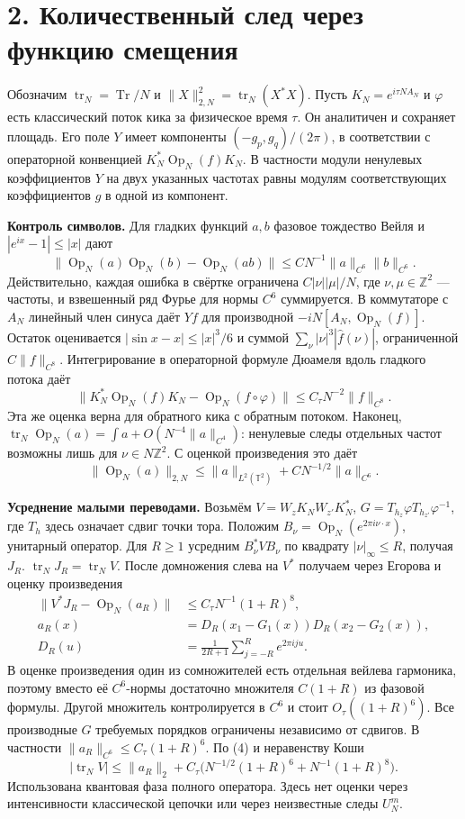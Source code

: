 \documentclass[11pt,a4paper]{article}
\newcommand{\Tr}{\operatorname{Tr}}
\newcommand{\Op}{\operatorname{Op}}
\newcommand{\T}{\mathbb{T}}
\newcommand{\Z}{\mathbb Z}
\newcommand{\sect}[1]{\section*{\sffamily\color{ink}#1}}
\newcommand{\subt}[1]{\par\medskip\noindent\textbf{#1.}\quad}
\begin{document}
\newpage
\sect{2. Количественный след через функцию смещения}
Обозначим \(\operatorname{tr}_N=\Tr/N\) и \(\|X\|_{2,N}^2=\operatorname{tr}_N(X^*X)\). Пусть \(K_N=e^{i\tau N A_N}\) и \(\varphi\) есть классический поток кика за физическое время \(\tau\). Он аналитичен и сохраняет площадь. Его поле \(Y\) имеет компоненты \((-g_p,g_q)/(2\pi)\), в соответствии с операторной конвенцией \(K_N^*\Op_N(f)K_N\). В частности модули ненулевых коэффициентов \(Y\) на двух указанных частотах равны модулям соответствующих коэффициентов \(g\) в одной из компонент.

\subt{Контроль символов}
Для гладких функций \(a,b\) фазовое тождество Вейля и \(|e^{ix}-1|\le |x|\) дают
\[
 \|\Op_N(a)\Op_N(b)-\Op_N(ab)\|
       \le C N^{-1}\|a\|_{C^6}\|b\|_{C^6}.
\]
Действительно, каждая ошибка в свёртке ограничена
\(C|\nu||\mu|/N\), где \(\nu,\mu\in\Z^2\) — частоты, и взвешенный ряд Фурье для нормы \(C^6\) суммируется. В коммутаторе с \(A_N\) линейный член синуса даёт \(Yf\) для производной \(-iN[A_N,\Op_N(f)]\). Остаток оценивается \(|\sin x-x|\le |x|^3/6\) и суммой \(\sum_\nu |\nu|^3|\widehat f(\nu)|\), ограниченной \(C\|f\|_{C^8}\). Интегрирование в операторной формуле Дюамеля вдоль гладкого потока даёт
\[
 \|K_N^*\Op_N(f)K_N-\Op_N(f\circ\varphi)\|
     \le C_\tau N^{-2}\|f\|_{C^8}.
\]
Эта же оценка верна для обратного кика с обратным потоком. Наконец, \(\operatorname{tr}_N\Op_N(a)=\int a+O(N^{-4}\|a\|_{C^4})\): ненулевые следы отдельных частот возможны лишь для \(\nu\in N\Z^2\). С оценкой произведения это даёт
\[
  \|\Op_N(a)\|_{2,N}\le\|a\|_{L^2(\T^2)}
                              +C N^{-1/2}\|a\|_{C^6}.             \tag{4}
\]

\subt{Усреднение малыми переводами}
Возьмём \(V=W_z K_N W_{z'}K_N^*\), \(G=T_{h_z}\varphi T_{h_{z'}}\varphi^{-1}\), где \(T_h\) здесь означает сдвиг точки тора. Положим \(B_\nu=\Op_N(e^{2\pi i\nu\cdot x})\), унитарный оператор. Для \(R\ge1\) усредним \(B_\nu^* V B_\nu\) по квадрату \(|\nu|_\infty\le R\), получая \(J_R\). \(\operatorname{tr}_N J_R=\operatorname{tr}_N V\). После домножения слева на \(V^*\) получаем через Егорова и оценку произведения
\begin{align*}
 \|V^*J_R-\Op_N(a_R)\|&\le C_\tau N^{-1}(1+R)^8,\\
 a_R(x)&=D_R(x_1-G_1(x))D_R(x_2-G_2(x)),\\
 D_R(u)&=\frac1{2R+1}\sum_{j=-R}^R e^{2\pi i j u}.
\end{align*}
В оценке произведения один из сомножителей есть отдельная вейлева гармоника, поэтому вместо её \(C^6\)-нормы достаточно множителя \(C(1+R)\) из фазовой формулы. Другой множитель контролируется в \(C^6\) и стоит \(O_\tau((1+R)^6)\). Все производные \(G\) требуемых порядков ограничены независимо от сдвигов. В частности \(\|a_R\|_{C^6}\le C_\tau(1+R)^6\). По (4) и неравенству Коши
\begin{equation}
 |\operatorname{tr}_N V|\le \|a_R\|_2+
        C_\tau\big(N^{-1/2}(1+R)^6+N^{-1}(1+R)^8\big).            \tag{5}
\end{equation}
Использована квантовая фаза полного оператора. Здесь нет оценки через интенсивности классической цепочки или через неизвестные следы \(U_N^m\).
\end{document}
